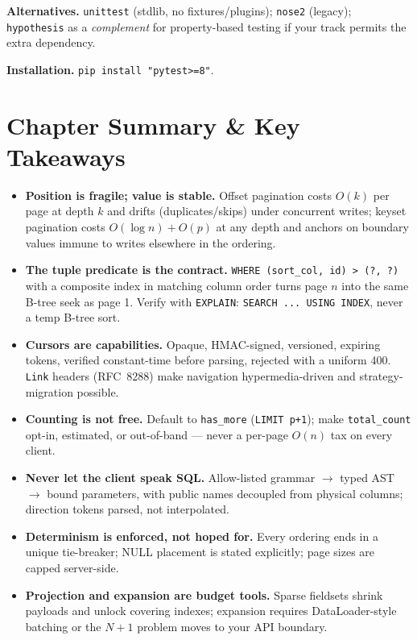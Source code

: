 \textbf{Alternatives.} \texttt{unittest} (stdlib, no fixtures/plugins);
\texttt{nose2} (legacy); \texttt{hypothesis} as a \emph{complement} for
property-based testing if your track permits the extra dependency.

\textbf{Installation.} \texttt{pip install "pytest>=8"}.

\section{Chapter Summary \& Key Takeaways}
\label{sec:ch8-summary}

\begin{itemize}
  \item \textbf{Position is fragile; value is stable.} Offset pagination
        costs $O(k)$ per page at depth $k$ and drifts (duplicates/skips)
        under concurrent writes; keyset pagination costs $O(\log n) + O(p)$
        at any depth and anchors on boundary values immune to writes
        elsewhere in the ordering.
  \item \textbf{The tuple predicate is the contract.} \texttt{WHERE
        (sort\_col, id) > (?, ?)} with a composite index in matching column
        order turns page $n$ into the same B-tree seek as page 1. Verify
        with \texttt{EXPLAIN}: \texttt{SEARCH ... USING INDEX}, never a
        temp B-tree sort.
  \item \textbf{Cursors are capabilities.} Opaque, HMAC-signed, versioned,
        expiring tokens, verified constant-time before parsing, rejected
        with a uniform 400. \texttt{Link} headers (RFC~8288) make
        navigation hypermedia-driven and strategy-migration possible.
  \item \textbf{Counting is not free.} Default to \texttt{has\_more}
        (\texttt{LIMIT p+1}); make \texttt{total\_count} opt-in, estimated,
        or out-of-band --- never a per-page $O(n)$ tax on every client.
  \item \textbf{Never let the client speak SQL.} Allow-listed grammar
        $\to$ typed AST $\to$ bound parameters, with public names decoupled
        from physical columns; direction tokens parsed, not interpolated.
  \item \textbf{Determinism is enforced, not hoped for.} Every ordering
        ends in a unique tie-breaker; NULL placement is stated explicitly;
        page sizes are capped server-side.
  \item \textbf{Projection and expansion are budget tools.} Sparse
        fieldsets shrink payloads and unlock covering indexes; expansion
        requires DataLoader-style batching or the $N{+}1$ problem moves to
        your API boundary.
\end{itemize}

